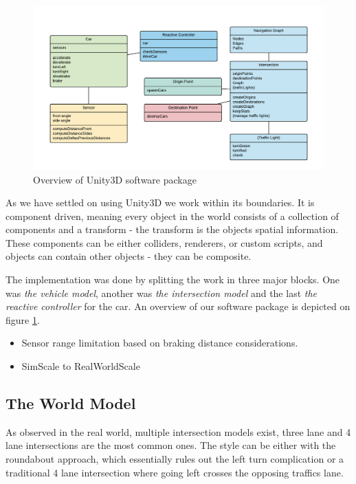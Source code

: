 \begin{figure}
\centering
\includegraphics[scale=.6]{img/classdiagram}
\caption{Overview of Unity3D software package}
\label{figure:classdiagram}
\end{figure}

As we have settled on using Unity3D we work within its boundaries.
It is component driven, meaning every object in the world consists of a collection of components and a transform - the transform is the objects spatial information.
These components can be either colliders, renderers, or custom scripts, and objects can contain other objects - they can be composite.

The implementation was done by splitting the work in three major blocks. One was \textit{the vehicle model}, another was \textit{the intersection model} and the last \textit{the reactive controller} for the car.
An overview of our software package is depicted on figure \ref{figure:classdiagram}.

\begin{itemize}
\item Sensor range limitation based on braking distance considerations.
\item SimScale to RealWorldScale
\end{itemize}

\subsection{The World Model}
As observed in the real world, multiple intersection models exist, three lane and 4 lane intersections are the most common ones.
The style can be either with the roundabout approach, which essentially rules out the left turn complication or a traditional 4 lane intersection where going left crosses the opposing traffics lane.

